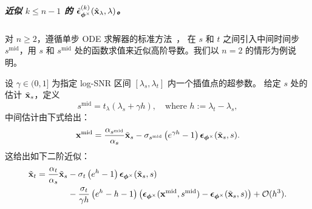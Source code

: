 




\subparagraph{近似 $k \le n-1$ 的 {\color{cyan}$\hat{\bm{\epsilon}}_{\bm{\phi}^\times}^{(k)}(\hat{{\mathbf{x}}}_\lambda,\lambda)$}。}
对 $n \ge 2$，遵循单步 ODE 求解器的标准方法~\citep{atkinson2009numerical}，\citet{lu2022dpm} 在 $s$ 和 $t$ 之间引入中间时间步 $s^{\mathrm{mid}}$，用 $s$ 和 $s^{\mathrm{mid}}$ 处的函数求值来近似高阶导数。我们以 $n = 2$ 的情形为例说明。

设 $\gamma \in (0,1]$ 为指定 log-SNR 区间 $[\lambda_s, \lambda_t]$ 内一个插值点的超参数。
给定 $s$ 处的估计 $\tilde{{\mathbf{x}}}_s$，定义
\[
    s^{\mathrm{mid}} = t_\lambda\left(\lambda_s + \gamma h\right), \quad \text{where } h := \lambda_t - \lambda_s,
\]
中间估计由下式给出：
\[
    {\mathbf{x}}^{\mathrm{mid}} = \frac{\alpha_{s^{\mathrm{mid}}}}{\alpha_s} \tilde{{\mathbf{x}}}_s - \sigma_{s^{\mathrm{mid}}} \left(e^{\gamma h} - 1\right) \bm{\epsilon}_{\bm{\phi}^\times}(\tilde{{\mathbf{x}}}_s, s).
\]
这给出如下二阶近似：
\begin{align}
\label{eq:dpm-solver-2-app}
\begin{aligned}
    \tilde{{\mathbf{x}}}_{t} = \frac{\alpha_{t}}{\alpha_s} \tilde{{\mathbf{x}}}_s 
    &- \sigma_{t} \left(e^{h} - 1\right) \bm{\epsilon}_{\bm{\phi}^\times}(\tilde{{\mathbf{x}}}_s, s) \\
    &- \frac{\sigma_t}{\gamma h} \left(e^{h} - h - 1\right) \left( \bm{\epsilon}_{\bm{\phi}^\times}({\mathbf{x}}^{\mathrm{mid}}, s^{\mathrm{mid}}) - \bm{\epsilon}_{\bm{\phi}^\times}(\tilde{{\mathbf{x}}}_s, s) \right)
     +  \mathcal{O}(h^3).
\end{aligned}
\end{align}


